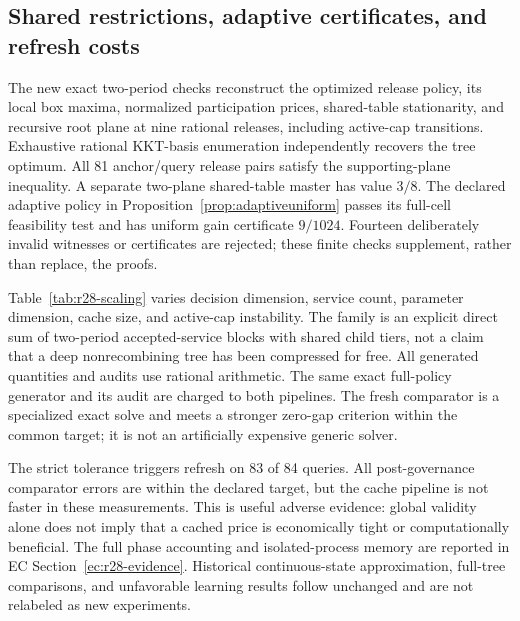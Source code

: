 \subsection{Shared restrictions, adaptive certificates, and refresh costs}
The new exact two-period checks reconstruct the optimized release policy, its local box maxima, normalized participation prices, shared-table stationarity, and recursive root plane at nine rational releases, including active-cap transitions. Exhaustive rational KKT-basis enumeration independently recovers the tree optimum. All 81 anchor/query release pairs satisfy the supporting-plane inequality. A separate two-plane shared-table master has value $3/8$. The declared adaptive policy in Proposition~\ref{prop:adaptiveuniform} passes its full-cell feasibility test and has uniform gain certificate $9/1024$. Fourteen deliberately invalid witnesses or certificates are rejected; these finite checks supplement, rather than replace, the proofs.

Table~\ref{tab:r28-scaling} varies decision dimension, service count, parameter dimension, cache size, and active-cap instability. The family is an explicit direct sum of two-period accepted-service blocks with shared child tiers, not a claim that a deep nonrecombining tree has been compressed for free. All generated quantities and audits use rational arithmetic. The same exact full-policy generator and its audit are charged to both pipelines. The fresh comparator is a specialized exact solve and meets a stronger zero-gap criterion within the common target; it is not an artificially expensive generic solver.

The strict tolerance triggers refresh on 83 of 84 queries. All post-governance comparator errors are within the declared target, but the cache pipeline is not faster in these measurements. This is useful adverse evidence: global validity alone does not imply that a cached price is economically tight or computationally beneficial. The full phase accounting and isolated-process memory are reported in EC Section~\ref{ec:r28-evidence}. Historical continuous-state approximation, full-tree comparisons, and unfavorable learning results follow unchanged and are not relabeled as new experiments.

